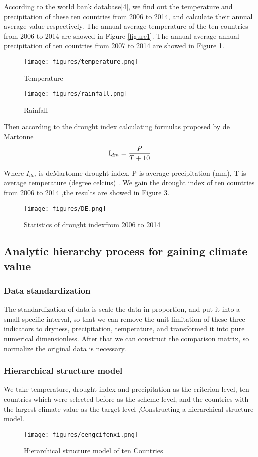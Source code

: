 \documentclass{mcmthesis}
\begin{document}
According to the world bank database[4], we find out the temperature and precipitation of these ten countries from 2006 to 2014, and calculate their annual average value respectively. The annual average temperature of the ten countries from 2006 to 2014 are showed in Figure \ref{figure1}. The annual average annual precipitation of ten countries from 2007 to 2014 are showed in Figure \ref{figure2}.

\begin{figure}[htbp]
\centering
\begin{minipage}{4cm}
\centering
\texttt{[image: figures/temperature.png]}
\caption{Temperature}
\label{figure1}
\end{minipage}
\begin{minipage}{4cm}
\centering
\texttt{[image: figures/rainfall.png]}
\caption{Rainfall}
\label{figure2}
\end{minipage}
\end{figure}

Then according to the drought index calculating formulas proposed by de Martonne 
\[{{\rm{I}}_{dm}} = \frac{P}{{T + 10}}\]
\par Where $I_{dm}$ is deMartonne drought index, P is average precipitation (mm), T is average temperature (degree celcius) .
We gain the drought index of ten countries from 2006 to 2014 ,the results are showed 
in Figure 3.

\begin{figure}[htbp]
\centering
\label{figure3}
\texttt{[image: figures/DE.png]}
\caption{Statistics of drought indexfrom 2006 to 2014}
\end{figure}


\subsection{Analytic hierarchy process for gaining climate value}
\subsubsection{Data standardization}
The standardization of data is scale the data in proportion, and put it into a small specific interval, so that we can remove the unit limitation of these three indicators to dryness, precipitation, temperature, and transformed it into pure numerical dimensionless. After that we can construct the comparison matrix, so normalize the original data is necessary.
\subsubsection{Hierarchical structure model}
We take temperature, drought index and precipitation as the criterion level, ten countries which were selected before as the scheme level, and the countries with the largest climate value as the target level ,Constructing a hierarchical structure model.
\begin{figure}[htbp]
\centering
\label{figure3}
\texttt{[image: figures/cengcifenxi.png]}
\caption{Hierarchical structure model of ten Countries}
\end{figure}
\end{document}
